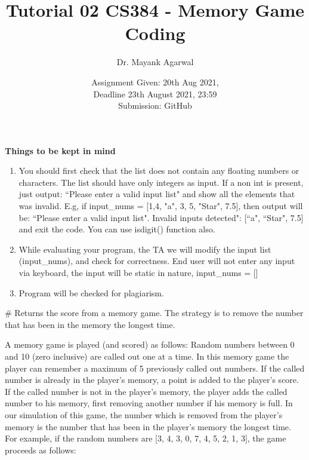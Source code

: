 \documentclass[12pt,  letterpaper,  twoside]{article}
\title{Tutorial 02 CS384 -  Memory Game Coding}
\author{Dr. Mayank Agarwal}
\date{Assignment Given: 20th Aug 2021,\\ Deadline 23th August 2021,  
23:59\\Submission: GitHub }
\begin{document}
	\maketitle  
	\textbf{Things to be kept in mind}\\
	\begin{enumerate}
		\item You should first check that the list does not contain any 
		floating numbers  or characters. The list should have only integers as 
		input. If 
		a non int is present, just output: ``Please enter a valid input list" 
		and show all the elements that was invalid. E.g, 
		if input\_nums = [1,4, "a", 3, 5, "Star", 7.5], then output will be:
		``Please enter a valid input list". Invalid inputs detected": [``a", 
		``Star", 7.5] and exit the code. You can use  
		isdigit() 
		function also. 
		
		\item While evaluating your program, the TA we will modify the input 
		list (input\_nums), and 
		check for 
		correctness. End user will not enter any input via keyboard, the input 
		will be 
		static in nature, input\_nums = []
		\item Program will be checked for plagiarism.  
	\end{enumerate}
	
	
	\# Returns the score from a memory game.  The strategy is to remove the 
	number that has
	 been in the memory the longest time.  
	
	A memory game is played (and scored) as follows: Random numbers between 0 
	and 10 (zero inclusive) are called out one at a time. In this memory game 
	the player can remember a maximum of 5 previously called out numbers. If 
	the called number is already in the player's memory, a point is added to 
	the player's score. If the called number is not in the player's memory, the 
	player adds the called number to his memory, first removing another number 
	if his memory is full. In our simulation of this game, the number which is 
	removed from the player's memory is the number that has been in the 
	player's memory the longest time. For example, if the random numbers are 
	[3, 4, 3, 0, 7, 4, 5, 2, 1, 3], the game proceeds as follows:
	
\end{document}
